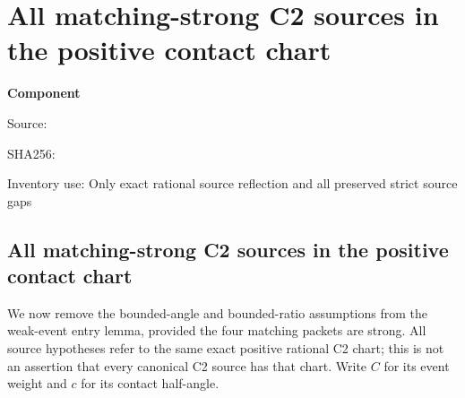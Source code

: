 \chapter{All matching-strong C2 sources in the positive contact chart}
\label{component:pf8e9d3c47c72}
\noindent\textbf{Component }\par
{\small\noindent Source: \par}
{\small\noindent SHA256: \par}
{\small\noindent Inventory use: Only exact rational source reflection and all preserved strict source gaps\par}
\medskip
\section{All matching-strong C2 sources in the positive contact chart}
\label{pf8e9d3c47c72:sec:matching-source-entry}

We now remove the bounded-angle and bounded-ratio assumptions from the
weak-event entry lemma, provided the four matching packets are strong.
All source hypotheses refer to the same exact positive rational C2 chart;
this is not an assertion that every canonical C2 source has that chart.
Write $C$ for its event weight and $c$ for its contact half-angle.

